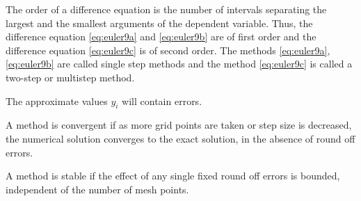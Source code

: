 \documentclass[../main-sheet.tex]{subfiles}
\begin{document}
\begin{note}
    The order of a difference equation is the number of intervals separating the largest and the smallest arguments of the dependent variable.
    Thus, the difference equation \eqref{eq:euler9a} and \eqref{eq:euler9b} are of first order and the difference equation \eqref{eq:euler9c} is of second order.
    The methods \eqref{eq:euler9a}, \eqref{eq:euler9b} are called single step methods and the method \eqref{eq:euler9c} is called a two-step or multistep method.
\end{note}
\begin{note}
    The approximate values \(y_i\) will contain errors.
\end{note}
\begin{defn}
    A method is convergent if as more grid points are taken or step size is decreased, the numerical solution converges to the exact solution, in the absence of round off errors.
\end{defn}
\begin{defn}
    A method is stable if the effect of any single fixed round off errors is bounded, independent of the number of mesh points.
\end{defn}
\end{document}
